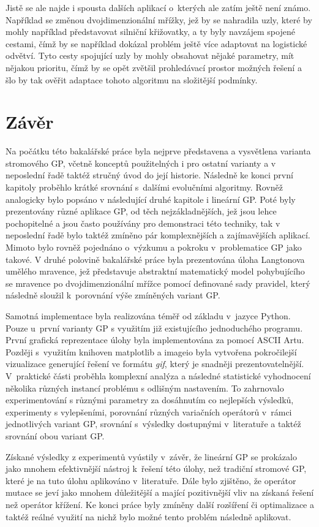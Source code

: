 Jistě se ale najde i spousta dalších aplikací o~kterých ale zatím ještě není známo. Například se změnou dvojdimenzionální mřížky, jež by se nahradila uzly, které by mohly například představovat silniční křižovatky, a ty byly navzájem spojené cestami, čímž by se například dokázal problém ještě více adaptovat na logistické odvětví. Tyto cesty spojující uzly by mohly obsahovat nějaké parametry, mít nějakou prioritu, čímž by se opět zvětšil prohledávací prostor možných řešení a šlo by tak ověřit adaptace tohoto algoritmu na složitější podmínky.


\chapter{Závěr}\label{ch:8}
Na počátku této bakalářské práce byla nejprve představena a vysvětlena varianta stromového GP, včetně konceptů použitelných i pro ostatní varianty a v neposlední řadě taktéž stručný úvod do její historie. Následně ke konci první kapitoly proběhlo krátké srovnání s~dalšími evolučními algoritmy. Rovněž analogicky bylo popsáno v následující druhé kapitole i lineární GP. Poté byly prezentovány různé aplikace GP, od těch nejzákladnějších, jež jsou lehce pochopitelné a jsou často používány pro demonstraci této techniky, tak v neposlední řadě bylo taktéž zmíněno pár komplexnějších a zajímavějších aplikací. Mimoto bylo rovněž pojednáno o~výzkumu a pokroku v~problematice GP jako takové. V druhé polovině bakalářské práce byla prezentována úloha Langtonova umělého mravence, jež představuje abstraktní matematický model pohybujícího se mravence po dvojdimenzionální mřížce pomocí definované sady pravidel, který následně sloužil k~porovnání výše zmíněných variant GP.

Samotná implementace byla realizována téměř od základu v~jazyce Python. Pouze u~první varianty GP s využitím již existujícího jednoduchého programu. První grafická reprezentace úlohy byla implementována za pomocí ASCII Artu. Později s~využitím knihoven matplotlib a imageio byla vytvořena pokročilejší vizualizace generující řešení ve formátu \emph{gif}, který je snadněji prezentovatelnější. V~praktické části proběhla komplexní analýza a následné statistické vyhodnocení několika různých instancí problému s odlišným nastavením. To zahrnovalo experimentování s různými parametry za dosáhnutím co nejlepších výsledků, experimenty s vylepšeními, porovnání různých variačních operátorů v~rámci jednotlivých variant GP, srovnání s~výsledky dostupnými v~literatuře a taktéž srovnání obou variant GP. 

Získané výsledky z experimentů vyústily v~závěr, že lineární GP se prokázalo jako mnohem efektivnější nástroj k~řešení této úlohy, než tradiční stromové GP, které je na tuto úlohu aplikováno v~literatuře. Dále bylo zjištěno, že operátor mutace se jeví jako mnohem důležitější a mající pozitivnější vliv na získaná řešení než operátor křížení. Ke konci práce byly zmíněny další rozšíření či optimalizace a taktéž reálné využití na nichž bylo možné tento problém následně aplikovat.
